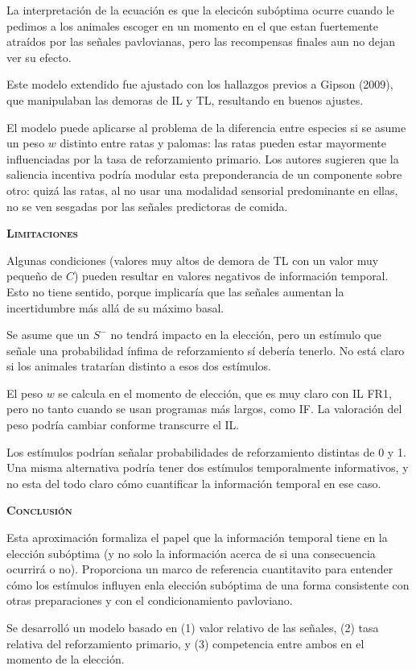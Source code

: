 \documentclass[a4paper,12pt]{article}
\begin{document}
La interpretación de la ecuación es que la elecicón subóptima ocurre cuando le pedimos a los animales escoger en un momento en el que estan fuertemente atraídos por las señales pavlovianas, pero las recompensas finales aun no dejan ver su efecto.

Este modelo extendido fue ajustado con los hallazgos previos a Gipson (2009), que manipulaban las demoras de IL y TL, resultando en buenos ajustes.

El modelo puede aplicarse al problema de la diferencia entre especies si se asume un peso $w$ distinto entre ratas y palomas: las ratas pueden estar mayormente influenciadas por la tasa de reforzamiento primario. Los autores sugieren que la saliencia incentiva podría modular esta preponderancia de un componente sobre otro: quizá las ratas, al no usar una modalidad sensorial predominante en ellas, no se ven sesgadas por las señales predictoras de comida.

{\scshape\bfseries Limitaciones}

Algunas condiciones (valores muy altos de demora de TL con un valor muy pequeño de $C$) pueden resultar en valores negativos de información temporal. Esto no tiene sentido, porque implicaría que las señales aumentan la incertidumbre más allá de su máximo basal.

Se asume que un $S^-$ no tendrá impacto en la elección, pero un estímulo que señale una probabilidad ínfima de reforzamiento sí debería tenerlo. No está claro si los animales tratarían distinto a esos dos estímulos.

El peso $w$ se calcula en el momento de elección, que es muy claro con IL FR1, pero no tanto cuando se usan programas más largos, como IF. La valoración del peso podría cambiar conforme transcurre el IL.

Los estímulos podrían señalar probabilidades de reforzamiento distintas de 0 y 1. Una misma alternativa podría tener dos estímulos temporalmente informativos, y no esta del todo claro cómo cuantificar la información temporal en ese caso.

{\scshape\bfseries Conclusión}

Esta aproximación formaliza el papel que la información temporal tiene en la elección subóptima (y no solo la información acerca de si una consecuencia ocurrirá o no). Proporciona un marco de referencia cuantitavito para entender cómo los estímulos influyen enla elección subóptima de una forma consistente con otras preparaciones y con el condicionamiento pavloviano.

Se desarrolló un modelo basado en (1) valor relativo de las señales, (2) tasa relativa del reforzamiento primario, y (3) competencia entre ambos en el momento de la elección.
\end{document}
